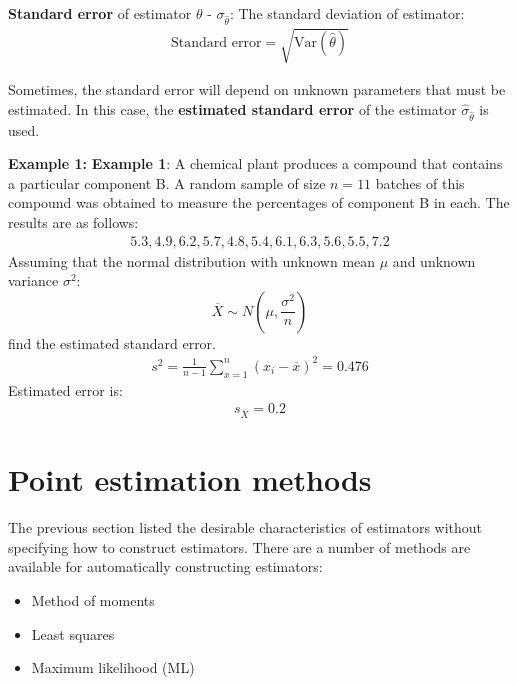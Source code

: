 \documentclass[10pt,a4paper]{article}
\begin{document}
\begin{tcolorbox}[breakable,colback=white]
\textbf{Standard error} of estimator $\theta$ - $\sigma_{\hat{\theta}}$: The standard deviation of estimator:
\begin{align*}
    \text{Standard error} = \sqrt{\text{Var}(\hat{\theta})}
\end{align*} 
\end{tcolorbox}

Sometimes, the standard error will depend on unknown parameters that must be estimated. In this
case, the \textbf{estimated standard error} of the estimator $\hat{\sigma}_{\hat{\theta}}$ is used.

\textbf{Example 1:} \textbf{Example 1}: A chemical plant produces a compound that contains a particular component B. A
random sample of size $n = 11$ batches of this compound was obtained to measure the percentages of component
B in each. The results are as follows:
\begin{align*}
    5.3, 4.9, 6.2, 5.7, 4.8, 5.4, 6.1, 6.3, 5.6, 5.5, 7.2
\end{align*}
Assuming that the normal distribution with unknown mean $\mu$ and unknown variance $\sigma^2$:
$$
    \overline{X} \sim N\left(\mu, \frac{\sigma^2}{n}\right)
$$
find the estimated standard error.
\begin{align*}
    s^2 = \frac{1}{n-1} \sum_{x=1}^n (x_i - \overline{x})^2 = 0.476
\end{align*}
Estimated error is:
\begin{align*}
    s_{\overline{X}} = 0.2
\end{align*}

\section{Point estimation methods}

The previous section listed the desirable characteristics of estimators without specifying how to
construct estimators. There are a number of methods are available for automatically constructing
estimators:
\begin{itemize}
    \item Method of moments
    \item Least squares
    \item Maximum likelihood (ML)
\end{itemize}
\end{document}
